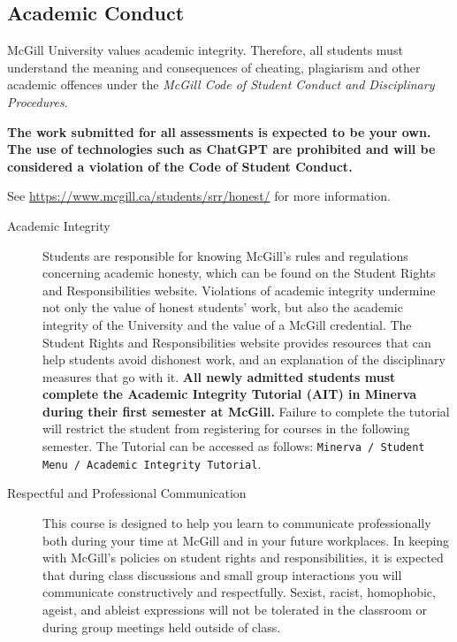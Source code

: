 \documentclass{article}
\begin{document}
\newpage

\subsection{Academic Conduct}

McGill University values academic integrity. Therefore, all students
must understand the meaning and consequences of cheating, plagiarism
and other academic offences under the {\em McGill Code of Student Conduct
  and Disciplinary Procedures}.

{\bf The work submitted for all assessments is expected to be your
  own. The use of technologies such as ChatGPT are prohibited and will
  be considered a violation of the Code of Student Conduct.}

See \url{https://www.mcgill.ca/students/srr/honest/} for more
information.

\begin{description} 
\item[Academic Integrity]{Students are responsible for knowing
  McGill's rules and regulations concerning academic honesty, which
  can be found on the Student Rights and Responsibilities
  website. Violations of academic integrity undermine not only the
  value of honest students' work, but also the academic integrity of
  the University and the value of a McGill credential. The Student
  Rights and Responsibilities website provides resources that can help
  students avoid dishonest work, and an explanation of the
  disciplinary measures that go with it. 
  {\bf All newly admitted students must complete the Academic
    Integrity Tutorial (AIT) in Minerva during their first semester at
    McGill.} Failure to complete the tutorial will restrict the
  student from registering for courses in the following semester. The
  Tutorial can be accessed as follows: \texttt{Minerva / Student Menu
    / Academic Integrity Tutorial}.}
\item[Respectful and Professional Communication]{This course is
  designed to help you learn to communicate professionally both during
  your time at McGill and in your future workplaces. In keeping with
  McGill's policies on student rights and responsibilities, it is
  expected that during class discussions and small group interactions
  you will communicate constructively and respectfully. Sexist,
  racist, homophobic, ageist, and ableist expressions will not be
  tolerated in the classroom or during group meetings held outside of
  class.}
 \end{description}
\end{document}
